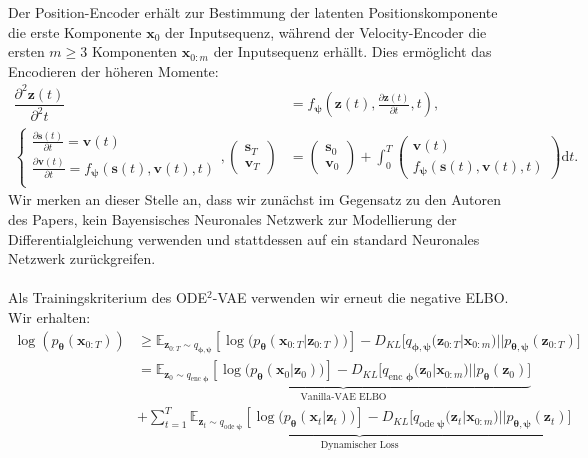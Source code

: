 \documentclass[12pt]{article}
\newcommand{\E}{\mathbb{E}}
\begin{document}
	Der Position-Encoder erhält zur Bestimmung der latenten Positionskomponente die erste Komponente $\mathbf x_{0}$ der Inputsequenz, während der Velocity-Encoder die ersten $m\geq 3$ Komponenten $\mathbf x_{0:m}$ der Inputsequenz erhällt. Dies ermöglicht das Encodieren der höheren Momente:
	\begin{align*}
	\dfrac{\partial^2 \mathbf{z}(t)}{\partial^2 t}&=f_{\boldsymbol{\psi}}\left(\mathbf{z}(t), \tfrac{\partial \mathbf{z}(t)}{\partial t}, t\right), \\
	\begin{cases*}
	\tfrac{\partial \mathbf{s}(t)}{\partial t}=\mathbf v(t) \\
    \tfrac{\partial \mathbf{v}(t)}{\partial t}=f_{\boldsymbol{\psi}}(\mathbf s(t), \mathbf v(t), t) \\
	\end{cases*},
	\left(\begin{array}{cc}
	\mathbf s_{T} \\
	\mathbf v_{T}
	\end{array}\right)
	&=
	\left(\begin{array}{cc}
	\mathbf s_{0} \\
	\mathbf v_{0}
	\end{array}\right)
	+
	\int_{0}^{T}
	\left(\begin{array}{cc}
	\mathbf v(t) \\
	f_{\boldsymbol{\psi}}(\mathbf s(t), \mathbf v(t), t)
	\end{array}\right)
	\mathrm{d}t.
	\end{align*}
	Wir merken an dieser Stelle an, dass wir zunächst im Gegensatz zu den Autoren des Papers, kein Bayensisches Neuronales Netzwerk zur Modellierung der Differentialgleichung verwenden und stattdessen auf ein standard Neuronales Netzwerk zurückgreifen. \\ \\
	Als Trainingskriterium des ODE$^2$-VAE verwenden wir erneut die negative ELBO.
	Wir erhalten:
	\begin{align*}
	\log\left(p_{\boldsymbol{\theta}}(\mathbf{x}_{0:T})\right)&\ge \E_{\mathbf{z}_{0:T}\sim q_{\boldsymbol\phi,\boldsymbol\psi}}
	\left[\log\big(p_{\boldsymbol\theta}\left(\mathbf{x}_{0:T}|\mathbf{z}_{0:T}\right)\big)\right] - D_{KL}\big[q_{\boldsymbol\phi,\boldsymbol\psi}(\mathbf{z}_{0:T}|\mathbf{x}_{0:m})||p_{\boldsymbol\theta,\boldsymbol\psi}(\mathbf{z}_{0:T})\big]\\
	&=\underbrace{\E_{\mathbf{z}_{0}\sim q_{\text{enc }\boldsymbol\phi}}
	\left[\log\big(p_{\boldsymbol\theta}\left(\mathbf{x}_{0}|\mathbf{z}_{0}\right)\big)\right] - D_{KL}\big[q_{\text{enc }\boldsymbol\phi}(\mathbf{z}_{0}|\mathbf{x}_{0:m})||p_{\boldsymbol\theta}(\mathbf{z}_{0})\big]}_{\text{Vanilla-VAE ELBO}}\\ &+ \underbrace{\sum_{t=1}^T \E_{\mathbf{z}_{t}\sim q_{\text{ode }\boldsymbol\psi}}
	\left[\log\big(p_{\boldsymbol\theta}\left(\mathbf{x}_{t}|\mathbf{z}_{t}\right)\big)\right] - D_{KL}\big[q_{\text{ode }\boldsymbol\psi}(\mathbf{z}_{t}|\mathbf{x}_{0:m})||p_{\boldsymbol\theta,\boldsymbol\psi}(\mathbf{z}_{t})\big]}_{\text{Dynamischer Loss}}
	\end{align*}
\end{document}
